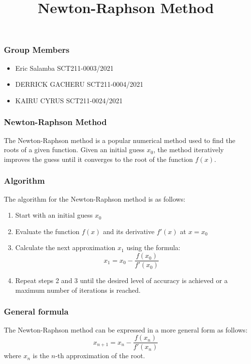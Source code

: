 \documentclass{beamer}
\title{Newton-Raphson Method}
\date{}
\begin{document}
\begin{frame}
    \titlepage
\end{frame}

\begin{frame}
    \frametitle{Group Members}
    \begin{itemize}
        \item Eric Salamba  SCT211-0003/2021
        \item DERRICK GACHERU  SCT211-0004/2021
        \item KAIRU CYRUS  SCT211-0024/2021
    \end{itemize}
\end{frame}

\begin{frame}
    \frametitle{Newton-Raphson Method}
    The Newton-Raphson method is a popular numerical method used to find the roots of a given function. Given an initial guess $x_0$, the method iteratively improves the guess until it converges to the root of the function $f(x)$.
\end{frame}

\begin{frame}
    \frametitle{Algorithm}
    The algorithm for the Newton-Raphson method is as follows:
    \begin{enumerate}
        \item Start with an initial guess $x_0$
        \item Evaluate the function $f(x)$ and its derivative $f'(x)$ at $x = x_0$
        \item Calculate the next approximation $x_1$ using the formula:
        \begin{equation*}
            x_1 = x_0 - \frac{f(x_0)}{f'(x_0)}
        \end{equation*}
        \item Repeat steps 2 and 3 until the desired level of accuracy is achieved or a maximum number of iterations is reached.
    \end{enumerate}
\end{frame}

\begin{frame}
    \frametitle{General formula}
    The Newton-Raphson method can be expressed in a more general form as follows:
    \begin{equation*}
        x_{n+1} = x_n - \frac{f(x_n)}{f'(x_n)}
    \end{equation*}
    where $x_n$ is the $n$-th approximation of the root.
\end{frame}
\end{document}

